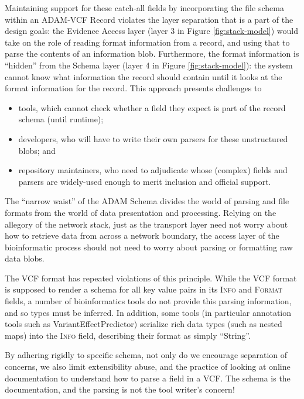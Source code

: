 \documentclass[10pt,twocolumn]{article}
\theoremstyle{plain}
\begin{document}
Maintaining support
for these catch-all fields by incorporating the file schema within an ADAM-VCF Record violates the layer separation that is a part of the design
goals: the Evidence Access layer (layer 3 in Figure \ref{fig:stack-model}) would take on the role of reading format information from a record, and using that to parse the contents of an
information blob. Furthermore, the format information is ``hidden'' from the Schema layer (layer 4 in Figure \ref{fig:stack-model}): the system cannot know what information the record
should contain until it looks at the format information for the record. This approach presents challenges to
 \begin{itemize}
      \item tools, which cannot check whether a field they
expect is part of the record schema (until runtime); 
      \item developers, who will have to write their own parsers for these unstructured blobs; and 
      \item repository maintainers, who need to adjudicate whose (complex) fields and parsers are widely-used enough to merit inclusion and official support.
\end{itemize}

The ``narrow waist'' of the ADAM Schema divides the world of parsing and file formats from the world of data presentation and processing.
Relying on the allegory of the network stack, just as the transport layer need not worry about how to retrieve data from across a network
boundary, the access layer of the bioinformatic process should not need to worry about parsing or formatting raw data blobs. 

The VCF format
has repeated violations of this principle. While the VCF format is supposed to render a schema for all key value pairs in its \textsc{Info}
and \textsc{Format} fields, a number of bioinformatics tools do not provide this parsing information, and so types must be inferred. In addition,
some tools (in particular annotation tools such as VariantEffectPredictor\cite{vep}) serialize rich data types (such as nested maps) into the
\textsc{Info} field, describing their format as simply ``String''. 

By adhering rigidly to specific schema, not only do we encourage separation of
concerns, we also limit extensibility abuse, and the practice of looking at online documentation to understand how to parse a field in a VCF.
The schema is the documentation, and the parsing is not the tool writer's concern!
\end{document}
